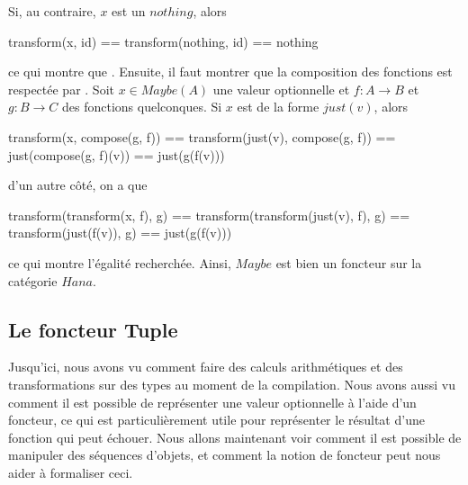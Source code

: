Si, au contraire, $x$ est un $nothing$, alors
\begin{cpp}
    transform(x, id) == transform(nothing, id)
                     == nothing
\end{cpp}

ce qui montre que . Ensuite, il faut montrer
que la composition des fonctions est respectée par . Soit
$x \in Maybe(A)$ une valeur optionnelle et $f : A \to B$ et $g : B \to C$
des fonctions quelconques. Si $x$ est de la forme $just(v)$, alors
\begin{cpp}
    transform(x, compose(g, f)) == transform(just(v), compose(g, f))
                                == just(compose(g, f)(v))
                                == just(g(f(v)))
\end{cpp}

d'un autre côté, on a que
\begin{cpp}
    transform(transform(x, f), g) == transform(transform(just(v), f), g)
                                  == transform(just(f(v)), g)
                                  == just(g(f(v)))
\end{cpp}

ce qui montre l'égalité recherchée. Ainsi, $Maybe$ est bien un foncteur
sur la catégorie $Hana$.



\subsection{Le foncteur Tuple}
Jusqu'ici, nous avons vu comment faire des calculs arithmétiques et des
transformations sur des types au moment de la compilation. Nous avons aussi
vu comment il est possible de représenter une valeur optionnelle à l'aide d'un
foncteur, ce qui est particulièrement utile pour représenter le résultat
d'une fonction qui peut échouer. Nous allons maintenant voir comment il est
possible de manipuler des séquences d'objets, et comment la notion de foncteur
peut nous aider à formaliser ceci.


